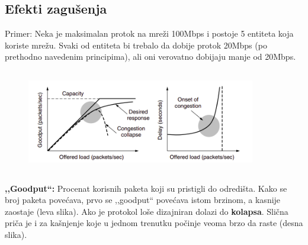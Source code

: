 \documentclass[a4paper]{article}
\begin{document}
    \subsection{Efekti zagušenja}
        Primer: Neka je maksimalan protok na mreži 100Mbps i postoje 5 entiteta koja koriste mrežu.
        Svaki od entiteta bi trebalo da dobije protok 20Mbps (po prethodno navedenim principima), 
        ali oni verovatno dobijaju manje od 20Mbps.
        \begin{figure}[H]
            \begin{center}
                \includegraphics[width=100mm,height=45mm]{Slike/tcp_zagusenje2.png}
            \end{center}
        \end{figure}
        \textbf{,,Goodput``:} Procenat korisnih paketa koji su pristigli do odredišta. Kako se 
        broj paketa povećava, prvo se ,,goodput`` povećava istom brzinom, a kasnije zaostaje 
        (leva slika). Ako je protokol loše dizajniran dolazi do \textbf{kolapsa}. Slična priča je i 
        za kašnjenje koje u jednom trenutku počinje veoma brzo da raste (desna slika). 
\end{document}
